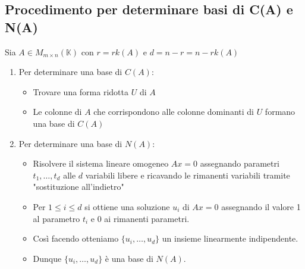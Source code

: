 \documentclass[a4paper]{article}
\theoremstyle{break}
\theoremstyle{break}
\theoremstyle{break}
\theoremstyle{break}
\begin{document}
\subsection{Procedimento per determinare basi di C(A) e N(A)}
Sia \( A \in M_{m \times n}(\mathbb{K}) \) con \( r = rk(A) \) e \( d = n-r = n - rk(A) \) 
\begin{enumerate}
  \item Per determinare una base di \( C(A) \):
    \begin{itemize}
      \item Trovare una forma ridotta \( U \) di \( A \)
      \item Le colonne di \( A \) che corrispondono alle colonne dominanti di \( U \) 
        formano una base di \( C(A) \)
    \end{itemize}

  \item Per determinare una base di \( N(A) \):
    \begin{itemize}
      \item Risolvere il sistema lineare omogeneo \( Ax = 0 \) assegnando parametri
        \( t_1, \ldots, t_d \) alle \( d \) variabili libere e ricavando le rimanenti
        variabili tramite "sostituzione all'indietro"
      \item Per \( 1 \le  i \le d \) si ottiene una soluzione \( u_i \) di \( Ax=0 \) 
        assegnando il valore 1 al parametro \( t_i \) e 0 ai rimanenti parametri.
      \item Così facendo otteniamo \( \{u_i, \ldots, u_d\}  \) un insieme linearmente
        indipendente.
      \item Dunque \( \{u_i, \ldots, u_d\}  \) è una base di \( N(A) \).
    \end{itemize}
\end{enumerate}
\end{document}
